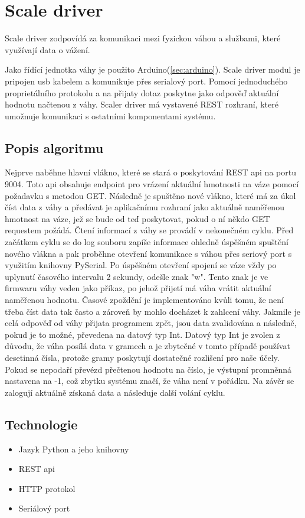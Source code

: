 \section{Scale driver}\label{sec:scale-driver}
Scale driver zodpovídá za komunikaci mezi fyzickou váhou a službami, které využívají data o vážení.\newline

Jako řídící jednotka váhy je použito Arduino(\ref{sec:arduino}).
Scale driver modul je pripojen usb kabelem a komunikuje přes serialový port.
Pomocí jednoduchého proprietálního protokolu a na přijaty dotaz  poskytne jako odpověď aktuální hodnotu načtenou z váhy.
Scaler driver má vystavené REST rozhraní, které umožnuje komunikaci s ostatními komponentami systému.

\subsection*{Popis algoritmu}
Nejprve naběhne hlavní vlákno, které se stará o poskytování REST api na portu 9004.
Toto api obsahuje endpoint pro vrázení aktuální hmotnosti na váze pomocí požadavku s metodou GET.
Následně je spuštěno nové vlákno, které má za úkol číst data z váhy a předávat je aplikačnímu rozhraní jako aktuálně naměřenou hmotnost na váze, jež se bude od teď poskytovat, pokud o ní někdo GET requestem požádá.
Čtení informací z váhy se provádí v nekonečném cyklu.
Před začátkem cyklu se do log souboru zapíše informace ohledně úspěšném spuštění nového vlákna a pak proběhne otevření komunikace s váhou přes seriový port s využitím knihovny PySerial.
Po úspěšném otevření spojení se váze vždy po uplynutí časového intervalu 2 sekundy, odešle znak "w".
Tento znak je ve firmwaru váhy veden jako příkaz, po jehož přijetí má váha vrátit aktuální naměřenou hodnotu.
Časové zpoždění je implementováno kvůli tomu, že není třeba číst data tak často a zároveň by mohlo docházet k zahlcení váhy.
Jakmile je celá odpověď od váhy přijata programem zpět, jsou data zvalidována a následně, pokud je to možné, převedena na datový typ Int.
Datový typ Int je zvolen z důvodu, že váha posílá data v gramech a je zbytečné v tomto případě používat desetinná čísla, protože gramy poskytují dostatečné rozlišení pro naše účely.
Pokud se nepodaří převézd přečtenou hodnotu na číslo, je výstupní promněnná nastavena na -1, což zbytku systému značí, že váha není v pořádku.
Na závěr se zalogují aktuálně získaná data a následuje další volání cyklu.

\subsection*{Technologie}
\begin{itemize}
    \item Jazyk Python a jeho knihovny
    \item REST api
    \item HTTP protokol
    \item Seriálový port
\end{itemize}


